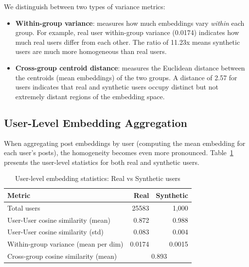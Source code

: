 We distinguish between two types of variance metrics:
\begin{itemize}
	\item \textbf{Within-group variance}: measures how much embeddings vary \textit{within} each group. For example, real user within-group variance (0.0174) indicates how much real users differ from each other. The ratio of 11.23x means synthetic users are much more homogeneous than real users.
	\item \textbf{Cross-group centroid distance}: measures the Euclidean distance between the centroids (mean embeddings) of the two groups. A distance of 2.57 for users indicates that real and synthetic users occupy distinct but not extremely distant regions of the embedding space.
\end{itemize}




\subsection*{User-Level Embedding Aggregation}

When aggregating post embeddings by user (computing the mean embedding for each user's posts), the homogeneity becomes even more pronounced. Table~\ref{tab:user_embedding_stats} presents the user-level statistics for both real and synthetic users.

\begin{table}[H]
	\centering
	\caption{User-level embedding statistics: Real vs Synthetic users}
	\label{tab:user_embedding_stats}
	\begin{tabular}{lrr}
		\toprule
		\textbf{Metric}                      & \textbf{Real}             & \textbf{Synthetic} \\
		\midrule
		Total users                          & 25583                    & 1,000              \\
		User-User cosine similarity (mean)   & 0.872                     & 0.988              \\
		User-User cosine similarity (std)    & 0.083                     & 0.004              \\
		Within-group variance (mean per dim) & 0.0174                    & 0.0015             \\
		Cross-group cosine similarity (mean) & \multicolumn{2}{c}{0.893}                      \\
		\bottomrule
	\end{tabular}
\end{table}

